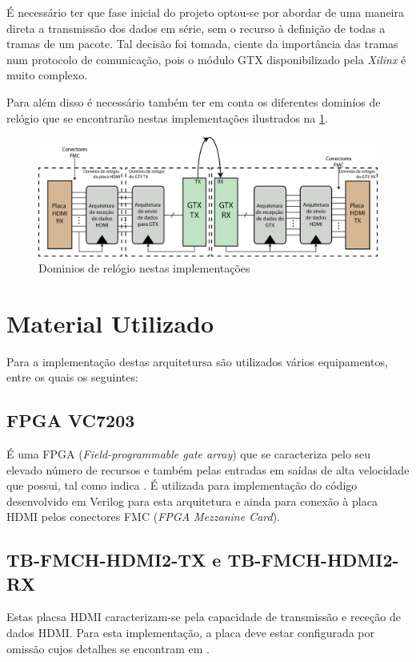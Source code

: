 \documentclass[11pt,a4paper]{article}
\begin{document}
	É necessário ter que fase inicial do projeto optou-se por abordar de uma maneira direta a transmissão dos dados em série, sem o recurso à definição de todas a tramas de um pacote. Tal decisão foi tomada, ciente da importância das tramas num protocolo de comunicação, pois o módulo GTX disponibilizado pela \textit{Xilinx} é muito complexo.
	
	Para além disso é necessário também ter em conta os diferentes dominíos de relógio que se encontrarão nestas implementações ilustrados na \cref{fig:dominos}.
	
		\begin{figure}[h!]
			\begin{center}
				\includegraphics[width=1.0\textwidth]{diagrama_dominios} 
				\caption{Dominios de relógio nestas implementações}
				\label{fig:dominos}
			\end{center}
		\end{figure}
	
	\section{Material Utilizado}
	Para a implementação destas arquitetursa são utilizados vários equipamentos, entre os quais os seguintes:
	\subsection{FPGA VC7203}
	É uma FPGA (\textit{Field-programmable gate array}) que se caracteriza pelo seu elevado número de recursos e também pelas entradas em saídas de alta velocidade que possui, tal como indica \cite{R008}. É utilizada para implementação do código desenvolvido em Verilog para esta arquitetura e ainda para conexão à placa HDMI pelos conectores FMC (\textit{FPGA Mezzanine Card}).
	\subsection{TB-FMCH-HDMI2-TX e TB-FMCH-HDMI2-RX}
	Estas placsa HDMI caracterizam-se pela capacidade de transmissão e receção de dados HDMI. Para esta implementação, a placa deve estar configurada por omissão cujos detalhes se encontram em \cite{R009}.
	
\end{document}
